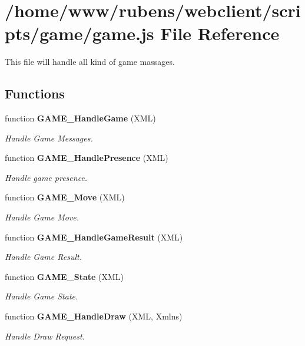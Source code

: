 \section{/home/www/rubens/webclient/scripts/game/game.js File Reference}
\label{game_2game_8js}
This file will handle all kind of game massages. 

\subsection*{Functions}
\begin{CompactItemize}
\item 
function {\bf GAME\_\-HandleGame} (XML)
\begin{CompactList}\small\item\em Handle Game Messages. \item\end{CompactList}\item 
function {\bf GAME\_\-HandlePresence} (XML)
\begin{CompactList}\small\item\em Handle game presence. \item\end{CompactList}\item 
function {\bf GAME\_\-Move} (XML)
\begin{CompactList}\small\item\em Handle Game Move. \item\end{CompactList}\item 
function {\bf GAME\_\-HandleGameResult} (XML)
\begin{CompactList}\small\item\em Handle Game Result. \item\end{CompactList}\item 
function {\bf GAME\_\-State} (XML)
\begin{CompactList}\small\item\em Handle Game State. \item\end{CompactList}\item 
function {\bf GAME\_\-HandleDraw} (XML, Xmlns)
\begin{CompactList}\small\item\em Handle Draw Request. \item\end{CompactList}\item 

\end{CompactItemize}
